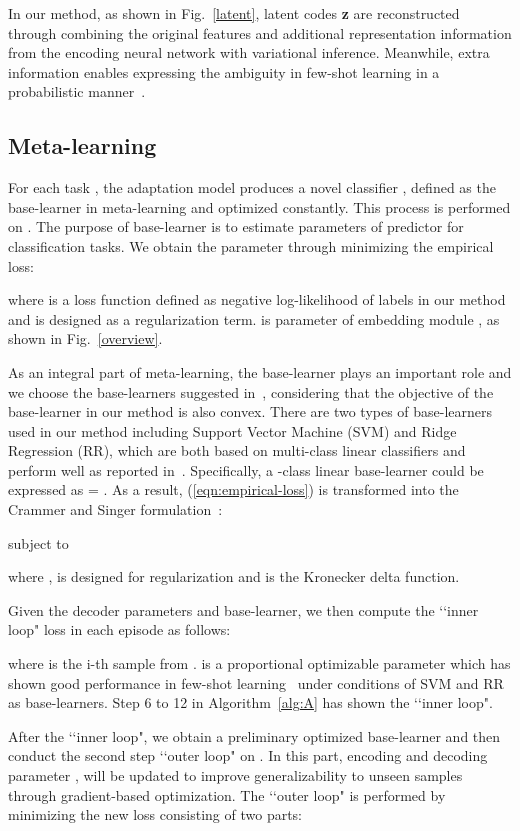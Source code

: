 \documentclass[10pt,conference,a4paper]{IEEEtran}
\begin{document}
In our method, as shown in Fig.~\ref{latent}, latent codes \textbf{z} are reconstructed through combining the original features  and additional representation information  from the encoding neural network with variational inference. Meanwhile, extra information enables expressing the ambiguity in few-shot learning in a probabilistic manner~\cite{PLATIPUS2018}.

\subsection{Meta-learning}
For each task , the adaptation model produces a novel classifier , defined as the base-learner in meta-learning and optimized constantly. This process is performed on . The purpose of base-learner  is to estimate parameters  of predictor for classification tasks. We obtain the parameter through minimizing the empirical loss: 

where  is a loss function defined as negative log-likelihood of labels in our method and  is designed as a regularization term.  is parameter of embedding module , as shown in Fig.~\ref{overview}.

As an integral part of meta-learning, the base-learner plays an important role and we choose the base-learners suggested in~\cite{lee2019meta}, considering that the objective of the base-learner in our method is also convex. There are two types of base-learners used in our method including Support Vector Machine (SVM) and Ridge Regression (RR), which are both based on multi-class linear classifiers and perform well as reported in~\cite{lee2019meta}. Specifically, a -class linear base-learner could be expressed as  = . As a result, (\ref{eqn:empirical-loss}) is transformed into the Crammer and Singer formulation~\cite{crammer2001algorithmic}: 

subject to 

where ,  is designed for regularization and  is the Kronecker delta function.

Given the decoder parameters and base-learner, we then compute the ‘‘inner loop" loss in each episode as follows: 

where  is the i-th sample from .  is a proportional optimizable parameter which has shown good performance in few-shot learning~\cite{bertinetto2019meta, oreshkin2018tadam} under conditions of SVM and RR as base-learners. Step 6 to 12 in Algorithm~\ref{alg:A} has shown the ‘‘inner loop".

After the ‘‘inner loop", we obtain a preliminary optimized base-learner and then conduct the second step ‘‘outer loop" on . In this part, encoding and decoding parameter ,  will be updated to improve generalizability to unseen samples through gradient-based optimization. The ‘‘outer loop" is performed by minimizing the new loss  consisting of two parts: 
\end{document}
